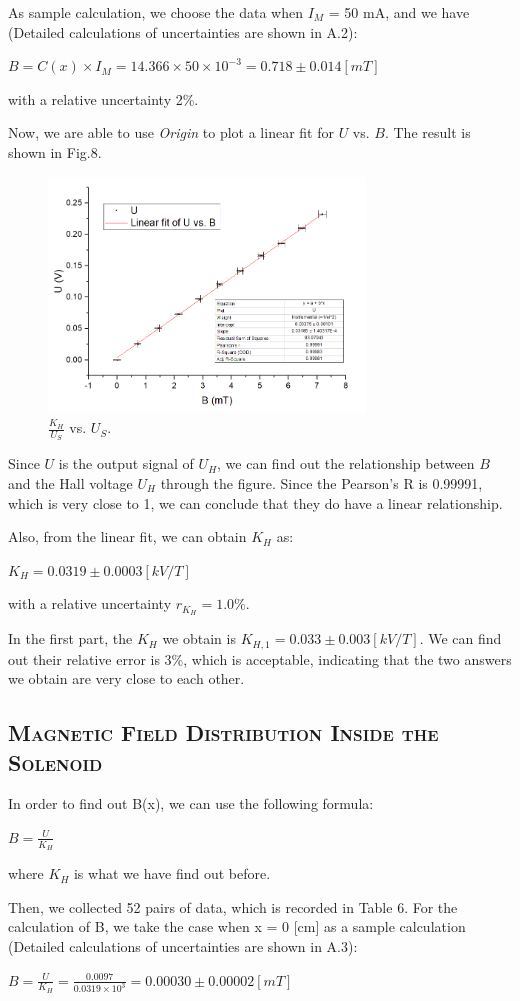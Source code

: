 \documentclass[a4paper,12pt]{article}
\begin{document}
\newpage
As sample calculation, we choose the data when $I_M$ = 50 mA, and we have (Detailed calculations of uncertainties are shown in A.2):
\begin{center}
$\displaystyle B = C(x) \times I_M = 14.366 \times 50 \times 10^{-3} = 0.718 \pm 0.014 [mT] $
\end{center}
with a relative uncertainty 2\%.
\par Now, we are able to use \textit{Origin} to plot a linear fit for $U$ vs. $B$. The result is shown in Fig.8.
\begin{figure}[H] 
    \centering
    \includegraphics[width=0.75\textwidth]{p2} 
    \caption{$\frac{K_H}{U_S}$ vs. $U_S$.} 
\end{figure}
Since $U$ is the output signal of $U_H$, we can find out the relationship between $B$ and the Hall voltage $U_H$ through the figure. Since the Pearson's R is 0.99991, which is very close to 1, we can conclude that they do have a linear relationship.
\par Also, from the linear fit, we can obtain $K_H$ as:
\begin{center}
$ K_H = 0.0319 \pm 0.0003 [kV/T]$
\end{center}
with a relative uncertainty $r_{K_H} = 1.0\%$.
\par In the first part, the $K_H$ we obtain is $K_{H,1} = 0.033 \pm 0.003 [kV/T] $. We can find out their relative error is 3\%, which is acceptable, indicating that the two answers we obtain are very close to each other.



\subsection{\textsc{Magnetic Field Distribution Inside the Solenoid}}
In order to find out B(x), we can use the following formula:
\begin{center}
$ \displaystyle B = \frac{U}{K_H} $
\end{center}
where $K_H$ is what we have find out before.
\par Then, we collected 52 pairs of data, which is recorded in Table 6. For the calculation of B, we take the case when x = 0 [cm] as a sample calculation (Detailed calculations of uncertainties are shown in A.3):
\begin{center}
$ \displaystyle B = \frac{U}{K_H} = \frac{0.0097}{0.0319 \times 10^3} = 0.00030 \pm 0.00002 [mT] $
\end{center}
\end{document}
